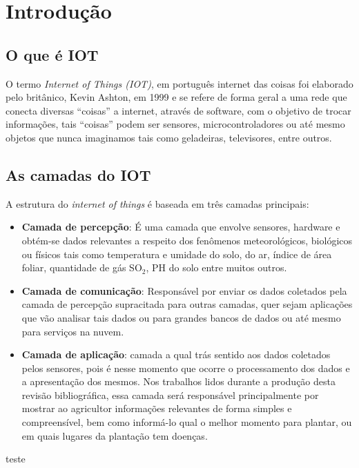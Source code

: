 \documentclass[12pt, a4paper]{article}
\begin{document}
\capa
\tableofcontents
\listoffigures
\listoftables
\cleardoublepage

\section{Introdução}
\subsection{O que é IOT}\label{O que é IOT}

O termo \textit{Internet of Things (IOT)}, em português internet das coisas foi elaborado pelo britânico, Kevin Ashton, em 1999\cite{5} e se refere de forma geral a uma rede que conecta diversas ``coisas'' a internet, através de software, com o objetivo de trocar informações\cite{defIot}, tais ``coisas'' podem ser sensores, microcontroladores ou até mesmo objetos que nunca imaginamos tais como geladeiras, televisores, entre outros.

\subsection{As camadas do IOT}\label{As camadas do IOT}

A estrutura do \textit{internet of things} é baseada em três camadas principais\cite{5}:
  \begin{itemize}
      \item \textbf{Camada de percepção}: É uma camada que envolve sensores, hardware e obtém-se dados relevantes a respeito dos fenômenos meteorológicos, biológicos ou físicos tais como  temperatura e umidade do solo\cite{3}, do ar\cite{9}, índice de área foliar\cite{8}, quantidade de gás SO$_{2}$\cite{13}, PH do solo\cite{13} entre muitos outros.
      \item \textbf{Camada de comunicação}: Responsável por enviar os dados coletados pela camada de percepção supracitada para outras camadas, quer sejam aplicações que vão analisar tais dados ou para grandes bancos de dados ou até mesmo para serviços na nuvem.
      \item \textbf{Camada de aplicação}: camada a qual trás sentido aos dados coletados pelos sensores, pois é nesse momento que ocorre o processamento dos dados e a apresentação dos mesmos. Nos trabalhos lidos durante a produção desta revisão bibliográfica, essa camada será responsável principalmente por mostrar ao agricultor informações relevantes de forma simples e compreensível, bem como informá-lo qual o melhor momento para plantar\cite{1}, ou em quais lugares da plantação tem doenças\cite{2}.
      \end{itemize}
teste\cite{performance_mqtt}
\end{document}
